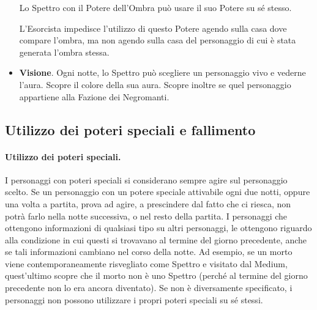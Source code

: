 \documentclass[a4paper,10pt]{article}
\begin{document}
\begin{itemize}
 Lo Spettro con il Potere dell'Ombra può usare il suo Potere su sé stesso.
 
 L'Esorcista impedisce l'utilizzo di questo Potere agendo sulla casa dove compare l'ombra, ma non agendo sulla casa del personaggio di cui è stata generata l'ombra stessa.

  \item {\bf Visione}. Ogni notte, lo Spettro può scegliere un personaggio vivo e vederne l'aura. Scopre il colore della sua aura. Scopre inoltre se quel personaggio appartiene alla Fazione dei Negromanti.
 
%  

\end{itemize}


\subsection{Utilizzo dei poteri speciali e fallimento}
\label{fallimento}

\paragraph{Utilizzo dei poteri speciali.} I personaggi con poteri speciali si considerano sempre agire sul personaggio scelto. %
Se un personaggio con un potere speciale attivabile ogni due notti, oppure una volta a partita, prova ad agire, a prescindere dal fatto che ci riesca, non potrà farlo nella notte successiva, o nel resto della partita.
I personaggi che ottengono informazioni di qualsiasi tipo su altri personaggi, le ottengono riguardo alla condizione in cui questi si trovavano al termine del giorno precedente, anche se tali informazioni cambiano nel corso della notte.
Ad esempio, se un morto viene contemporaneamente risvegliato come Spettro e visitato dal Medium, quest'ultimo scopre che il morto non è uno Spettro (perché al termine del giorno precedente non lo era ancora diventato).
Se non è diversamente specificato, i personaggi non possono utilizzare i propri poteri speciali su sé stessi.
\end{document}
